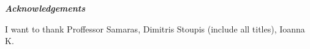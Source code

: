 \thispagestyle{plain}
\begin{center}
    \LARGE
    \textit{\textbf{Acknowledgements}}
        
    \vspace{0.4cm}
\end{center}
\normalsize

\vspace{0.9cm}

I want to thank Proffessor Samaras, Dimitris Stoupis (include all titles), Ioanna K.

\vspace*{\fill}


